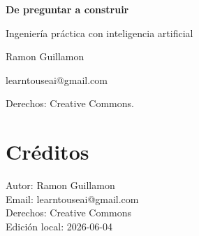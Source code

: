 \documentclass[11pt,twoside,openright]{book}
\begin{document}
\frontmatter
\BookCover
\cleardoublepage
\thispagestyle{empty}
\vspace*{35mm}
{\sffamily\bfseries\Huge\color{DeepBlue} De preguntar a construir\par}
\vspace{6mm}
{\sffamily\Large\color{Teal} Ingeniería práctica con inteligencia artificial\par}
\vspace{18mm}
{\sffamily\large Ramon Guillamon\par}
{\sffamily learntouseai@gmail.com\par}
\vfill
{\small Derechos: Creative Commons.}
\cleardoublepage
\tableofcontents
\mainmatter

\backmatter
\chapter*{Créditos}
Autor: Ramon Guillamon\\
Email: learntouseai@gmail.com\\
Derechos: Creative Commons\\
Edición local: 2026-06-04
\end{document}
